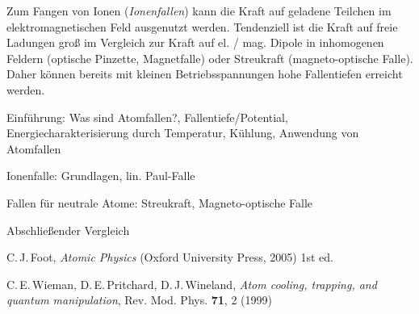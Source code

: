 \documentclass[twocolumn]{revtex4}
\begin{document}
Zum Fangen von Ionen (\emph{Ionenfallen}) kann die Kraft auf geladene Teilchen im elektromagnetischen Feld ausgenutzt werden.
Tendenziell ist die Kraft auf freie Ladungen groß im Vergleich zur Kraft auf el. / mag. Dipole in inhomogenen Feldern (optische Pinzette, Magnetfalle) oder Streukraft (magneto-optische Falle).
Daher können bereits mit kleinen Betriebsspannungen hohe Fallentiefen erreicht werden.



Einführung: Was sind Atomfallen?, Fallentiefe/Potential, Energiecharakterisierung durch Temperatur, Kühlung, Anwendung von Atomfallen

Ionenfalle: Grundlagen, lin. Paul-Falle

Fallen für neutrale Atome: Streukraft, Magneto-optische Falle

Abschließender Vergleich


\begin{thebibliography}{}
C.\,J.\,Foot, {\it Atomic Physics} (Oxford University Press, 2005) 1st ed.

C.\,E.\,Wieman, D.\,E.\,Pritchard, D.\,J.\,Wineland, {\it Atom cooling, trapping, and quantum manipulation}, Rev. Mod. Phys. \textbf{71}, 2 (1999)

\end{thebibliography}
\end{document}
